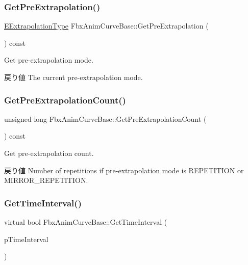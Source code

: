 \subsubsection{\texorpdfstring{Get\+Pre\+Extrapolation()}{GetPreExtrapolation()}}
{\footnotesize\ttfamily \hyperlink{class_fbx_anim_curve_base_aa7214d43daa7b6b9b47a8118a858847f}{E\+Extrapolation\+Type} Fbx\+Anim\+Curve\+Base\+::\+Get\+Pre\+Extrapolation (\begin{DoxyParamCaption}{ }\end{DoxyParamCaption}) const}

Get pre-\/extrapolation mode. \begin{DoxyReturn}{戻り値}
The current pre-\/extrapolation mode. 
\end{DoxyReturn}
\mbox{\label{class_fbx_anim_curve_base_a2b8d645a376937f0aa645e25373976e0}} 
\subsubsection{\texorpdfstring{Get\+Pre\+Extrapolation\+Count()}{GetPreExtrapolationCount()}}
{\footnotesize\ttfamily unsigned long Fbx\+Anim\+Curve\+Base\+::\+Get\+Pre\+Extrapolation\+Count (\begin{DoxyParamCaption}{ }\end{DoxyParamCaption}) const}

Get pre-\/extrapolation count. \begin{DoxyReturn}{戻り値}
Number of repetitions if pre-\/extrapolation mode is R\+E\+P\+E\+T\+I\+T\+I\+ON or M\+I\+R\+R\+O\+R\+\_\+\+R\+E\+P\+E\+T\+I\+T\+I\+ON. 
\end{DoxyReturn}
\mbox{\label{class_fbx_anim_curve_base_a4d259319e514c5371ff184b0cc7f7cd6}} 
\subsubsection{\texorpdfstring{Get\+Time\+Interval()}{GetTimeInterval()}}
{\footnotesize\ttfamily virtual bool Fbx\+Anim\+Curve\+Base\+::\+Get\+Time\+Interval (\begin{DoxyParamCaption}\item[{\hyperlink{class_fbx_time_span}{Fbx\+Time\+Span} \&}]{p\+Time\+Interval }\end{DoxyParamCaption})\hspace{0.3cm}{\ttfamily [virtual]}}

